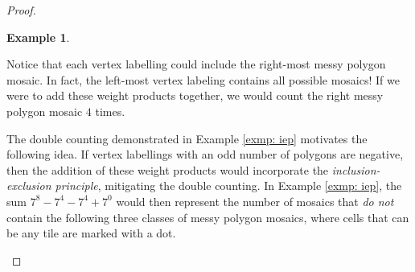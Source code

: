 \documentclass[12pt]{article}
\theoremstyle{plain}
\theoremstyle{definition}
\theoremstyle{remark}
\theoremstyle{definition}
\newtheorem{exmp}{Example}[section]
\newcommand{\cellopen}[4]{ \draw[thick] ( #1 , #2 ) rectangle ( #3 , #4 ); \node[shape=circle,draw=red,fill=red, inner sep=0pt,minimum size=3pt] (A) at ( #1 * 0.5 + #3 * 0.5 , #2 * 0.5 + #4 * 0.5 ){};}
\newcommand{\cellA}[4]{ \draw[thick] ( #1 , #2 ) rectangle ( #3 , #4 ); \draw[red, thick, densely dotted] (#3 * 0.5 + #1 * 0.5 , #2) -- (#3, #4 * 0.5 + #2 * 0.5);}
\newcommand{\cellB}[4]{ \draw[thick] ( #1 , #2 ) rectangle ( #3 , #4 ); \draw[red, thick, densely dotted] (#3 * 0.5 + #1 * 0.5 , #2) -- (#1, #4 * 0.5 + #2 * 0.5);}
\newcommand{\cellC}[4]{ \draw[thick] ( #1 , #2 ) rectangle ( #3 , #4 ); \draw[red, thick, densely dotted] (#3 * 0.5 + #1 * 0.5 , #4) -- (#1, #4 * 0.5 + #2 * 0.5);}
\newcommand{\cellD}[4]{ \draw[thick] ( #1 , #2 ) rectangle ( #3 , #4 ); \draw[red, thick, densely dotted] (#3 * 0.5 + #1 * 0.5 , #4) -- (#3, #4 * 0.5 + #2 * 0.5);}
\newcommand{\lablnode}[3]{\node[shape=circle,draw=none,fill=none, inner sep=0pt,minimum size=5pt] (A) at ( #1 , #2 ) {#3};}
\newcommand{\lablvertex}[3]{\node[shape=circle,draw=none,fill=white, inner sep=2pt,minimum size=5pt] (A) at ( #1 , #2 ) {#3};}
\begin{document}
\begin{proof}
\begin{exmp}
\begin{center}
\end{center}

Notice that each vertex labelling could include the right-most messy polygon mosaic. In fact, the left-most vertex labeling contains all possible mosaics! If we were to add these weight products together, we would count the right messy polygon mosaic $4$ times.

\end{exmp}

The double counting demonstrated in Example \ref{exmp: iep} motivates the following idea. If vertex labellings with an odd number of polygons are negative, then the addition of these weight products would incorporate the \textit{inclusion-exclusion principle}, mitigating the double counting. In Example \ref{exmp: iep}, the sum $7^8 - 7^4 - 7^4 + 7^0$ would then represent the number of mosaics that \textit{do not} contain the following three classes of messy polygon mosaics, where cells that can be any tile are marked with a dot.

\begin{center}
\end{center}
\end{proof}
\end{document}
